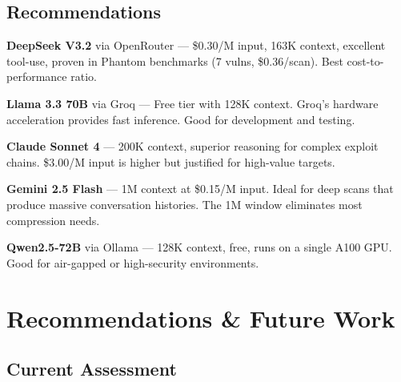 \documentclass[12pt,a4paper]{report}
\begin{document}
\section{Recommendations}

\begin{tipbox}
\textbf{DeepSeek V3.2} via OpenRouter --- \$0.30/M input, 163K context, excellent
tool-use, proven in Phantom benchmarks (7 vulns, \$0.36/scan). Best
cost-to-performance ratio.
\end{tipbox}

\begin{tipbox}
\textbf{Llama 3.3 70B} via Groq --- Free tier with 128K context. Groq's hardware
acceleration provides fast inference. Good for development and testing.
\end{tipbox}

\begin{tipbox}
\textbf{Claude Sonnet 4} --- 200K context, superior reasoning for complex exploit
chains. \$3.00/M input is higher but justified for high-value targets.
\end{tipbox}

\begin{tipbox}
\textbf{Gemini 2.5 Flash} --- 1M context at \$0.15/M input. Ideal for deep scans
that produce massive conversation histories. The 1M window eliminates most
compression needs.
\end{tipbox}

\begin{tipbox}
\textbf{Qwen2.5-72B} via Ollama --- 128K context, free, runs on a single A100 GPU.
Good for air-gapped or high-security environments.
\end{tipbox}


\chapter{Recommendations \& Future Work}
\label{ch:recommendations}

\section{Current Assessment}
\end{document}
